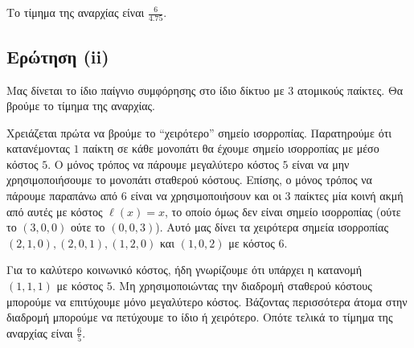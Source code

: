 Το τίμημα της αναρχίας είναι $ \frac{6}{4.75} $.

\subsection{Ερώτηση (ii)}

Μας δίνεται το ίδιο παίγνιο συμφόρησης στο ίδιο δίκτυο με 3 ατομικούς παίκτες.
Θα βρούμε το τίμημα της αναρχίας.

Χρειάζεται πρώτα να βρούμε το ``χειρότερο'' σημείο ισορροπίας. Παρατηρούμε ότι
κατανέμοντας $1$ παίκτη σε κάθε μονοπάτι θα έχουμε σημείο ισορροπίας με μέσο
κόστος $5$. Ο μόνος τρόπος να πάρουμε μεγαλύτερο κόστος $5$ είναι να μην
χρησιμοποιήσουμε το μονοπάτι σταθερού κόστους. Επίσης, ο μόνος τρόπος να πάρουμε
παραπάνω από $6$ είναι να χρησιμοποιήσουν και οι $3$ παίκτες μία κοινή ακμή από
αυτές με κόστος $\ell(x) = x$, το οποίο όμως δεν είναι σημείο ισορροπίας (ούτε
το $(3, 0, 0)$ ούτε το $(0, 0, 3)$). Αυτό μας δίνει τα χειρότερα σημεία
ισορροπίας $(2, 1, 0), (2, 0, 1), (1, 2, 0)$ και $(1, 0, 2)$ με κόστος $6$.

Για το καλύτερο κοινωνικό κόστος, ήδη γνωρίζουμε ότι υπάρχει η
κατανομή $(1, 1, 1)$ με κόστος $5$. Μη χρησιμοποιώντας την διαδρομή σταθερού
κόστους μπορούμε να επιτύχουμε μόνο μεγαλύτερο κόστος. Βάζοντας περισσότερα
άτομα στην διαδρομή μπορούμε να πετύχουμε το ίδιο ή χειρότερο. Οπότε τελικά το
τίμημα της αναρχίας είναι $\frac{6}{5}$.
